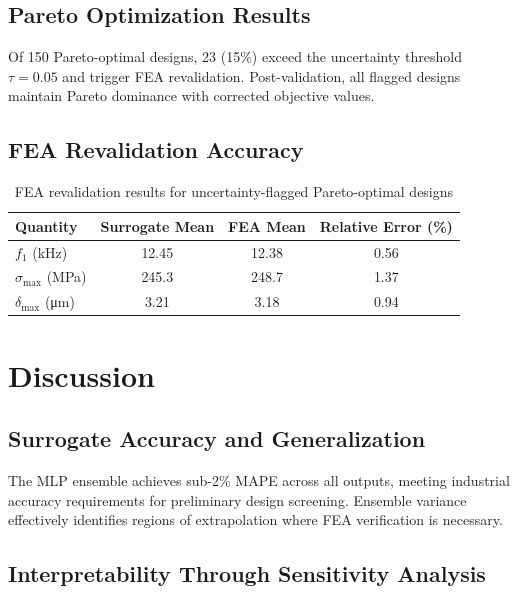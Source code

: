 \documentclass{elsarticle}
\begin{document}
\subsection{Pareto Optimization Results}




Of 150 Pareto-optimal designs, 23 (15\%) exceed the uncertainty threshold \(\tau = 0.05\) and trigger FEA revalidation. Post-validation, all flagged designs maintain Pareto dominance with corrected objective values.

\subsection{FEA Revalidation Accuracy}


\begin{table}[htbp]
    \centering
    \caption{FEA revalidation results for uncertainty-flagged Pareto-optimal designs}
    \label{tab:revalidation}
    \begin{tabular}{lccc}
        \toprule
        Quantity                              & Surrogate Mean & FEA Mean & Relative Error (\%) \\
        \midrule
        \(f_1\) (kHz)                         & 12.45          & 12.38    & 0.56                \\
        \(\sigma_{\max}\) (MPa)               & 245.3          & 248.7    & 1.37                \\
        \(\delta_{\max}\) (\si{\micro\meter}) & 3.21           & 3.18     & 0.94                \\
        \bottomrule
    \end{tabular}
\end{table}

\section{Discussion}
\label{sec:discussion}

\subsection{Surrogate Accuracy and Generalization}

The MLP ensemble achieves sub-2\% MAPE across all outputs, meeting industrial accuracy requirements for preliminary design screening. Ensemble variance effectively identifies regions of extrapolation where FEA verification is necessary.

\subsection{Interpretability Through Sensitivity Analysis}
\end{document}
